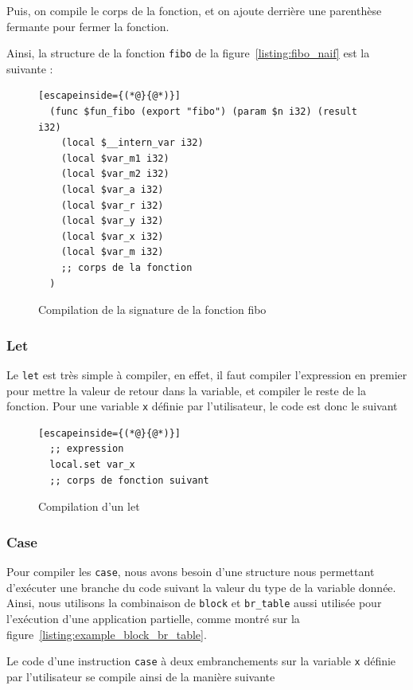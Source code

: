 \documentclass{rapportECL}
\begin{document}
Puis, on compile le corps de la fonction, et on ajoute derrière une parenthèse fermante pour fermer la fonction.

Ainsi, la structure de la fonction \verb|fibo| de la figure~\ref{listing:fibo_naif} est la suivante :
\begin{figure}[H]
	\begin{lstlisting}[escapeinside={(*@}{@*)}]
  (func $fun_fibo (export "fibo") (param $n i32) (result i32)
    (local $__intern_var i32)
    (local $var_m1 i32)
    (local $var_m2 i32)
    (local $var_a i32)
    (local $var_r i32)
    (local $var_y i32)
    (local $var_x i32)
    (local $var_m i32)
    ;; corps de la fonction
  )
	\end{lstlisting}
	\caption{Compilation de la signature de la fonction fibo}
	\label{listing:signature_fibo}
\end{figure}

\subsubsection{Let}

Le \verb|let| est très simple à compiler, en effet, il faut compiler l'expression en premier pour mettre la valeur de retour 
dans la variable, et compiler le reste de la fonction. Pour une variable \verb|x| définie par l'utilisateur, le code est donc le suivant

\begin{figure}[H]
	\begin{lstlisting}[escapeinside={(*@}{@*)}]
  ;; expression
  local.set var_x
  ;; corps de fonction suivant
	\end{lstlisting}
	\caption{Compilation d'un let}
	\label{listing:compile_let}
\end{figure}


\subsubsection{Case}

Pour compiler les \verb|case|, nous avons besoin d'une structure nous permettant d'exécuter une branche du code suivant la valeur du 
type de la variable donnée. Ainsi, nous utilisons la combinaison de \verb|block| et \verb|br_table| aussi utilisée pour l'exécution
d'une application partielle, comme montré sur la figure~\ref{listing:example_block_br_table}.

Le code d'une instruction \verb|case| à deux embranchements sur la variable \verb|x| définie par l'utilisateur 
se compile ainsi de la manière suivante
\end{document}
